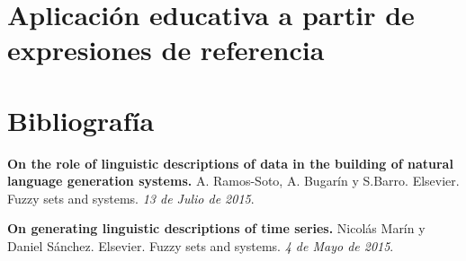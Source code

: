 \documentclass[10pt,a4paper]{article}
\begin{document}
\section{Aplicación educativa a partir de expresiones de referencia}

\newpage

\section{Bibliografía}
\begin{enumerate}[{[}1{]}]
\item \textbf{On the role of linguistic descriptions of data in the building of natural language generation systems.} A. Ramos-Soto, A. Bugarín y S.Barro. Elsevier. Fuzzy sets and systems. \textit{13 de Julio de 2015}.
\item \textbf{On generating linguistic descriptions of time series.} Nicolás Marín y Daniel Sánchez. Elsevier. Fuzzy sets and systems. \textit{4 de Mayo de 2015}.
\end{enumerate}
\end{document}
